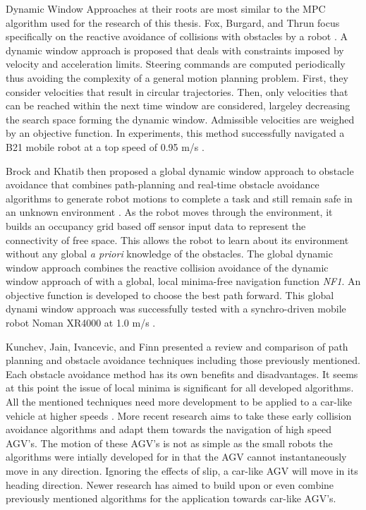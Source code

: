 \documentclass[12pt,onecolumn]{article}
\begin{document}
Dynamic Window Approaches at their roots are most similar to the MPC algorithm used for the research of this thesis. Fox, Burgard, and Thrun focus specifically on the reactive avoidance of collisions with obstacles by a robot \cite{Fox1997}. A dynamic window approach is proposed that deals with constraints imposed by velocity and acceleration limits. Steering commands are computed periodically thus avoiding the complexity of a general motion planning problem. First, they consider velocities that result in circular trajectories. Then, only velocities that can be reached within the next time window are considered, largeley decreasing the search space forming the dynamic window. Admissible velocities are weighed by an objective function. In experiments, this method successfully navigated a B21 mobile robot at a top speed of 0.95 m/s \cite{Fox1997}.

Brock and Khatib then proposed a global dynamic window approach to obstacle avoidance that combines path-planning and real-time obstacle avoidance algorithms to generate robot motions to complete a task and still remain safe in an unknown environment \cite{Brock&Khatib1999}. As the robot moves through the environment, it builds an occupancy grid based off sensor input data to represent the connectivity of free space. This allows the robot to learn about its environment without any global \textit{a priori} knowledge of the obstacles. The global dynamic window approach combines the reactive collision avoidance of the dynamic window approach of \cite{Fox1997} with a global, local minima-free navigation function \textit{NF1}. An objective function is developed to choose the best path forward. This global dynami window approach was successfully tested with a synchro-driven mobile robot Noman XR4000 at 1.0 m/s \cite{Brock&Khatib1999}.

Kunchev, Jain, Ivancevic, and Finn presented a review and comparison of path planning and obstacle avoidance techniques including those previously mentioned. Each obstacle avoidance method has its own benefits and disadvantages. It seems at this point the issue of local minima is significant for all developed algorithms. All the mentioned techniques need more development to be applied to a car-like vehicle at higher speeds \cite{Kunchev1999}. More recent research aims to take these early collision avoidance algorithms and adapt them towards the navigation of high speed AGV's. The motion of these AGV's is not as simple as the small robots the algorithms were intially developed for in that the AGV cannot instantaneously move in any direction. Ignoring the effects of slip, a car-like AGV will move in its heading direction. Newer research has aimed to build upon or even combine previously mentioned algorithms for the application towards car-like AGV's.
\end{document}

